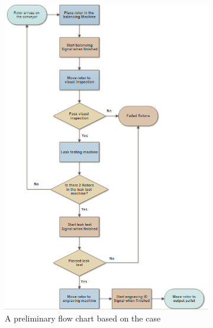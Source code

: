 \begin{figure}[h!]
\centering
    \begin{subfigure}{.49\textwidth}
    \centering
    \includegraphics[width=\textwidth]{InitialProblemstatement/Case/UMLcaseny.PNG}
    \caption{A preliminary flow chart based on the case}
    \label{fig:caseflow}
    \end{subfigure}
    \begin{subfigure}{.49\textwidth}
    \centering

\end{subfigure}
\end{figure}
